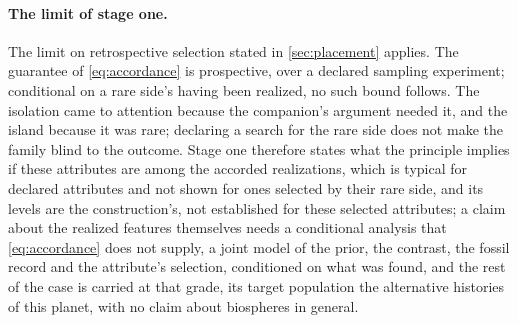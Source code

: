 \documentclass[11pt]{article}
\theoremstyle{definition}
\begin{document}
\paragraph{The limit of stage one.} The limit on retrospective selection stated in \autoref{sec:placement} applies. The guarantee of \eqref{eq:accordance} is prospective, over a declared sampling experiment; conditional on a rare side's having been realized, no such bound follows. The isolation came to attention because the companion's argument needed it, and the island because it was rare; declaring a search for the rare side does not make the family blind to the outcome. Stage one therefore states what the principle implies if these attributes are among the accorded realizations, which is typical for declared attributes and not shown for ones selected by their rare side, and its levels are the construction's, not established for these selected attributes; a claim about the realized features themselves needs a conditional analysis that \eqref{eq:accordance} does not supply, a joint model of the prior, the contrast, the fossil record and the attribute's selection, conditioned on what was found, and the rest of the case is carried at that grade, its target population the alternative histories of this planet, with no claim about biospheres in general.

\end{document}

